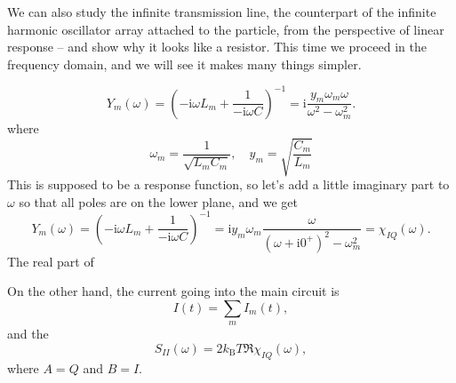 \documentclass[hyperref, a4paper]{article}
\newcommand*{\ii}{\mathrm{i}}
\newcommand*{\kB}{k_{\text{B}}}
\begin{document}
We can also study the infinite transmission line,
the counterpart of the infinite harmonic oscillator array 
attached to the particle,
from the perspective of linear response -- 
and show why it looks like a resistor.
This time we proceed in the frequency domain,
and we will see it makes many things simpler. 

\begin{equation}
    Y_m(\omega) = \left(
        - \ii \omega L_m + \frac{1}{- \ii \omega C}
    \right)^{-1} 
    = \ii \frac{y_m \omega_m \omega}{
        \omega^2 - \omega_m^2
    }. 
\end{equation}
where 
\begin{equation}
    \omega_m = \frac{1}{\sqrt{L_m C_m}}, \quad 
    y_m = \sqrt{\frac{C_m}{L_m}}
\end{equation}
This is supposed to be a response function,
so let's add a little imaginary part to $\omega$ 
so that all poles are on the lower plane,
and we get 
\begin{equation}
    Y_m(\omega) = \left(
        - \ii \omega L_m + \frac{1}{- \ii \omega C}
    \right)^{-1} 
    = \ii y_m \omega_m \frac{ \omega}{
        (\omega + \ii 0^+)^2 - \omega_m^2
    } = \chi_{I Q}(\omega). 
\end{equation}
The real part of 

On the other hand, the current going into the main circuit is 
\begin{equation}
    I(t) = \sum_m I_m(t),
\end{equation}
and the 
\begin{equation}
    S_{II}(\omega) = 2 \kB T \Re \chi_{I Q} (\omega),
\end{equation}
where $A = Q$ and $B = I$.

\printbibliography
\end{document}
